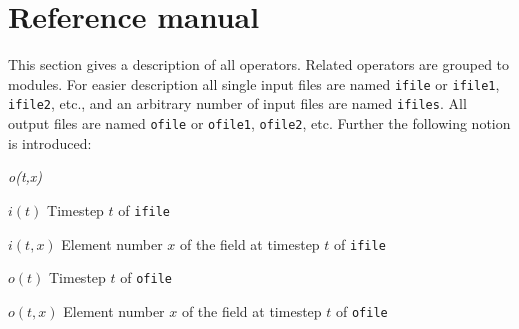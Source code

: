 \chapter{\label{refman}Reference manual}

This section gives a description of all operators. Related operators are grouped to modules.
For easier description all single input files are named {\tt ifile} or {\tt ifile1}, {\tt ifile2}, etc.,
and an arbitrary number of input files are named {\tt ifiles}.
All output files are named {\tt ofile} or {\tt ofile1}, {\tt ofile2}, etc.
Further the following notion is introduced:
\begin{defalist}{{\em o(t,x)}}
\item[\(i(t)\)\hfill]
Timestep \(t\) of {\tt ifile}
\item[\(i(t,x)\)\hfill]
Element number \(x\) of the field at timestep \(t\) of {\tt ifile}
\item[\(o(t)\)\hfill]
Timestep \(t\) of {\tt ofile}
\item[\(o(t,x)\)\hfill]
Element number \(x\) of the field at timestep \(t\) of {\tt ofile}
\end{defalist}





